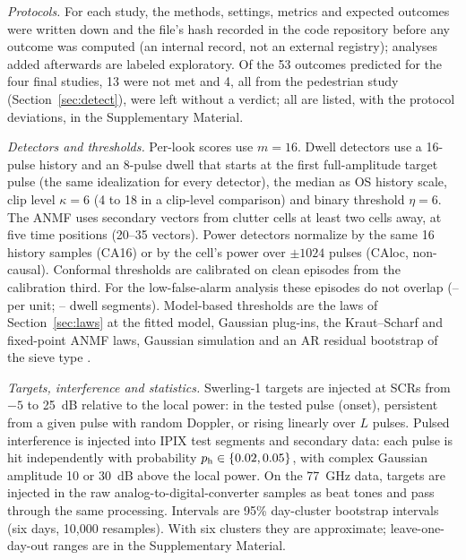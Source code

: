 \documentclass[journal]{IEEEtran}
\begin{document}
\emph{Protocols.} For each study, the methods, settings, metrics and expected outcomes were written down and the file's hash recorded in the code repository before any outcome was computed (an internal record, not an external registry); analyses added afterwards are labeled exploratory. Of the 53 outcomes predicted for the four final studies, 13 were not met and 4, all from the pedestrian study (Section~\ref{sec:detect}), were left without a verdict; all are listed, with the protocol deviations, in the Supplementary Material.

\emph{Detectors and thresholds.} Per-look scores use $m=16$. Dwell detectors use a 16-pulse history and an 8-pulse dwell that starts at the first full-amplitude target pulse (the same idealization for every detector), the median as OS history scale, clip level $\kappa=6$ (4 to 18 in a clip-level comparison) and binary threshold $\eta=6$. The ANMF uses secondary vectors from clutter cells at least two cells away, at five time positions (20--35 vectors). Power detectors normalize by the same 16 history samples (CA16) or by the cell's power over $\pm1024$ pulses (CAloc, non-causal). Conformal thresholds are calibrated on clean episodes from the calibration third. For the low-false-alarm analysis these episodes do not overlap (\LowCalMin--\LowCalMax{} per unit; \DwellCalMin--\DwellCalMax{} dwell segments). Model-based thresholds are the laws of Section~\ref{sec:laws} at the fitted model, Gaussian plug-ins, the Kraut--Scharf and fixed-point ANMF laws, Gaussian simulation and an AR residual bootstrap of the sieve type \cite{qu2024sieve}.

\emph{Targets, interference and statistics.} Swerling-1 targets are injected at SCRs from $-5$ to 25~dB relative to the local power: in the tested pulse (onset), persistent from a given pulse with random Doppler, or rising linearly over $L$ pulses. Pulsed interference is injected into IPIX test segments and secondary data: each pulse is hit independently with probability $p_{\rm h}\in\{0.02,0.05\}$, with complex Gaussian amplitude 10 or 30~dB above the local power. On the 77~GHz data, targets are injected in the raw analog-to-digital-converter samples as beat tones and pass through the same processing. Intervals are 95\% day-cluster bootstrap intervals (six days, 10,000 resamples). With six clusters they are approximate; leave-one-day-out ranges are in the Supplementary Material.
\end{document}
